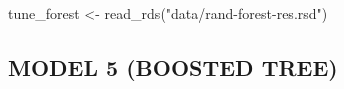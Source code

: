 \documentclass[
]{article}
\newenvironment{Shaded}{\begin{snugshade}}{\end{snugshade}}
\newcommand{\DecValTok}[1]{\textcolor[rgb]{0.00,0.00,0.81}{#1}}
\newcommand{\FunctionTok}[1]{\textcolor[rgb]{0.00,0.00,0.00}{#1}}
\newcommand{\NormalTok}[1]{#1}
\newcommand{\OtherTok}[1]{\textcolor[rgb]{0.56,0.35,0.01}{#1}}
\newcommand{\SpecialCharTok}[1]{\textcolor[rgb]{0.00,0.00,0.00}{#1}}
\newcommand{\StringTok}[1]{\textcolor[rgb]{0.31,0.60,0.02}{#1}}
\begin{document}
\begin{Shaded}
\begin{Highlighting}[]
\NormalTok{tune\_forest }\OtherTok{\textless{}{-}} \FunctionTok{read\_rds}\NormalTok{(}\StringTok{"data/rand{-}forest{-}res.rsd"}\NormalTok{)}
\end{Highlighting}
\end{Shaded}

\begin{Shaded}
\end{Shaded}

\hypertarget{model-5-boosted-tree}{%
\subsection{MODEL 5 (BOOSTED TREE)}\label{model-5-boosted-tree}}
\end{document}
